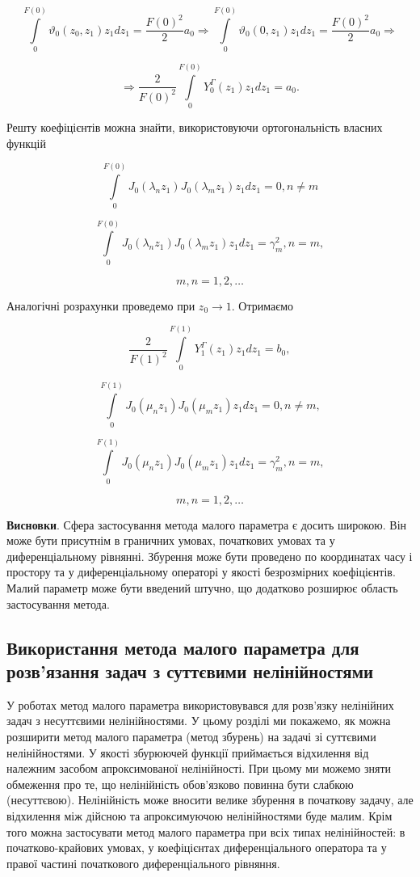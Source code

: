 $$
\int\limits_0^{F(0)}\vartheta_0(z_0, z_1)z_1 dz_1 = \frac{F(0)^2}{2}a_0  \Rightarrow
\int\limits_0^{F(0)}\vartheta_0(0, z_1)z_1 dz_1 = \frac{F(0)^2}{2}a_0  \Rightarrow
$$

$$
\Rightarrow\frac{2}{F(0)^2} \int\limits_0^{F(0)}Y^\Gamma_0(z_1)z_1 dz_1 = a_0.
$$

Решту коефіцієнтів можна знайти, використовуючи ортогональність власних функцій

$$
\int\limits_0^{F(0)}J_0(\lambda_n z_1)J_0(\lambda_m z_1)z_1 dz_1 = 0, n \neq m
$$

$$
\int\limits_0^{F(0)}J_0(\lambda_n z_1)J_0(\lambda_m z_1)z_1 dz_1 = \gamma_m^2, n = m,
$$

$$
m,n = 1, 2, \ldots
$$

Аналогічні розрахунки проведемо при $z_0 \to 1$. Отримаємо

$$
\frac{2}{F(1)^2}\int\limits_0^{F(1)}Y_1^\Gamma(z_1)z_1 dz_1 = b_0,
$$

$$
\int\limits_0^{F(1)}J_0(\mu_n z_1) J_0(\mu_m z_1) z_1 dz_1 = 0, n \neq m,
$$

$$
\int\limits_0^{F(1)}J_0(\mu_n z_1) J_0(\mu_m z_1) z_1 dz_1 = \gamma_m^2, n = m,
$$

$$
m,n = 1, 2, \ldots
$$

\textbf{Висновки}. Сфера застосування метода малого параметра є досить широкою. Він може бути присутнім в граничних
умовах, початкових умовах та у диференціальному рівнянні. Збурення може бути проведено по координатах часу і простору
та у диференціальному операторі у якості безрозмірних коефіцієнтів. Малий параметр може бути введений штучно, що
додатково розширює область застосування метода.

\subsection{Використання метода малого параметра для розв’язання задач з суттєвими нелінійностями} \label{sect1_2_2}

У роботах \cite{Ivanov-KResheniyu, LiOrlov-KTeorii, Marin-ObOdnom, Iampolski-OMetode, Lock-AStudy, Tadjbaksh-Free}
 метод малого параметра використовувався для розв’язку нелінійних
задач з несуттєвими нелінійностями. У цьому розділі ми покажемо, як можна розширити метод малого
параметра (метод збурень) на задачі зі суттєвими нелінійностями. У якості збурюючей функції
приймається відхилення від належним засобом апроксимованої нелінійності. При цьому ми можемо зняти
обмеження про те, що нелінійність обов’язково повинна бути слабкою (несуттєвою). Нелінійність може
вносити велике збурення в початкову задачу, але відхилення між дійсною та апроксимуючою нелінійностями буде
малим. Крім того можна застосувати метод малого параметра при всіх типах нелінійностей: в початково-крайових
умовах, у коефіцієнтах диференціального оператора та у правої частині початкового диференціального рівняння.

